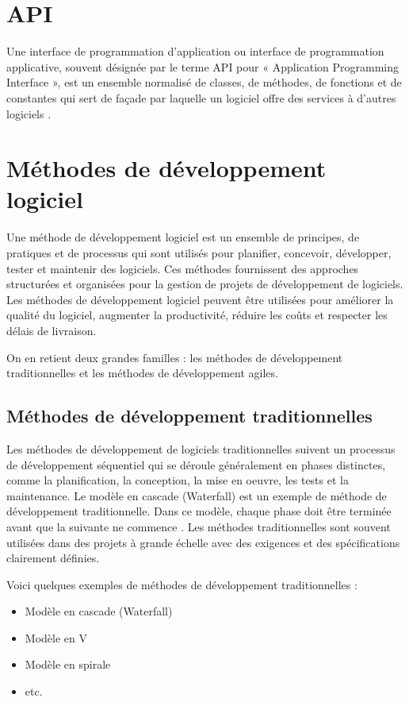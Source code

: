 \section{API}\label{subsec:api}
Une interface de programmation d’application ou interface de programmation applicative,
souvent désignée par le terme API pour « Application Programming Interface », est un ensemble
normalisé de classes, de méthodes, de fonctions et de constantes qui sert de façade par laquelle un
logiciel offre des services à d'autres logiciels \cite{richardson2007restful}\cite{fielding2000architectural}.

\section{Méthodes de développement logiciel}\label{sec:methode-de-developpement-logiciel}
Une méthode de développement logiciel est un ensemble de principes, de pratiques et de
processus qui sont utilisés pour planifier, concevoir, développer, tester et maintenir
des logiciels. Ces méthodes fournissent des approches structurées et organisées pour la
gestion de projets de développement de logiciels. Les méthodes de développement logiciel
peuvent être utilisées pour améliorer la qualité du logiciel, augmenter la productivité,
réduire les coûts et respecter les délais de livraison.

On en retient deux grandes familles : les méthodes de développement traditionnelles et
les méthodes de développement agiles.

\subsection{Méthodes de développement traditionnelles}
Les méthodes de développement de logiciels traditionnelles suivent un
processus de développement séquentiel qui se déroule généralement en phases
distinctes, comme la planification, la conception, la mise en oeuvre,
les tests et la maintenance. Le modèle en cascade (Waterfall) est un exemple
de méthode de développement traditionnelle. Dans ce modèle, chaque phase
doit être terminée avant que la suivante ne commence \cite{pressman2010software}. Les méthodes traditionnelles
sont souvent utilisées dans des projets à grande échelle avec des exigences et des
spécifications clairement définies.

Voici quelques exemples de méthodes de développement traditionnelles :

\begin{itemize}
    \item Modèle en cascade (Waterfall)
    \item Modèle en V
    \item Modèle en spirale
    \item etc.
\end{itemize}


